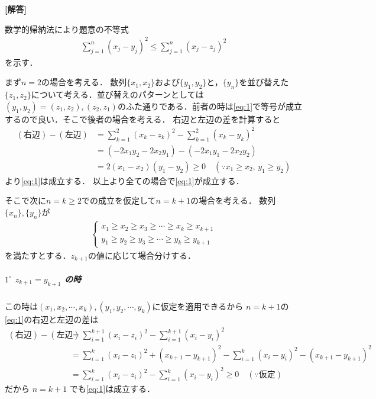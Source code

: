 \documentclass[../../main.tex]{subfiles}
\begin{document}
\begin{oframed}
  
\end{oframed}

{\bf [解答]}

数学的帰納法により題意の不等式
\begin{align}
  \sum_{j=1}^{n}(x_j-y_j)^2 \le \sum_{j=1}^{n}(x_j-z_j)^2 \label{eq:1}
\end{align}
を示す．

まず$n=2$の場合を考える．
数列$\{x_1,x_2\}$および$\{y_1,y_2\}$と，$\{y_n\}$を並び替えた$\{z_1,z_2\}$について考える．並び替えのパターンとしては$(y_1,y_2)=(z_1,z_2),(z_2,z_1)$のふた通りである．前者の時は\cref{eq:1}で等号が成立するので良い．そこで後者の場合を考える．
右辺と左辺の差を計算すると
\begin{align}
  (\text{右辺})-(\text{左辺})
  &= \sum_{k=1}^2 (x_k - z_k)^2 - \sum_{k=1}^2 (x_k - y_k)^2 \\
  &= (-2x_1 y_2 - 2x_2 y_1) - (-2x_1 y_1 - 2x_2 y_2) \\
  &= 2(x_1 - x_2)(y_1 - y_2) \ge 0 \quad (\because x_1 \ge x_2, \, y_1 \ge y_2)
\end{align}
より\cref{eq:1}は成立する．
以上より全ての場合で\cref{eq:1}が成立する．

そこで次に$n=k\ge 2$での成立を仮定して$n=k+1$の場合を考える．
数列$\{x_n\},\{y_n\}$が
\begin{align}
  \begin{cases}
    x_1 \ge x_2 \ge x_3 \ge \cdots \ge x_{k} \ge x_{k+1} \\
    y_1 \ge y_2 \ge y_3 \ge \cdots \ge y_{k} \ge y_{k+1}
  \end{cases}
\end{align}
を満たすとする．$z_{k+1}$の値に応じて場合分けする．


\subparagraph{$1^{\circ}$ $z_{k+1} = y_{k+1}$ の時}

この時は$(x_1,x_2,\cdots,x_{k}), (y_1,y_2,\cdots,y_{k})$に仮定を適用できるから
$n=k+1$の\cref{eq:1}の右辺と左辺の差は
\begin{align}
  (\text{右辺})-(\text{左辺})
  &= \sum_{i=1}^{k+1} (x_i - z_i)^2 - \sum_{i=1}^{k+1} (x_i - y_i)^2 \\
  &= \sum_{i=1}^k (x_i - z_i)^2 + (x_{k+1}-y_{k+1})^2 - \sum_{i=1}^k (x_i - y_i)^2 -  (x_{k+1}-y_{k+1})^2 \\
  &= \sum_{i=1}^k (x_i - z_i)^2 - \sum_{i=1}^k (x_i - y_i)^2 \ge 0 \quad (\because \text{仮定})
\end{align}
だから $n = k+1$ でも\cref{eq:1}は成立する．
\end{document}

